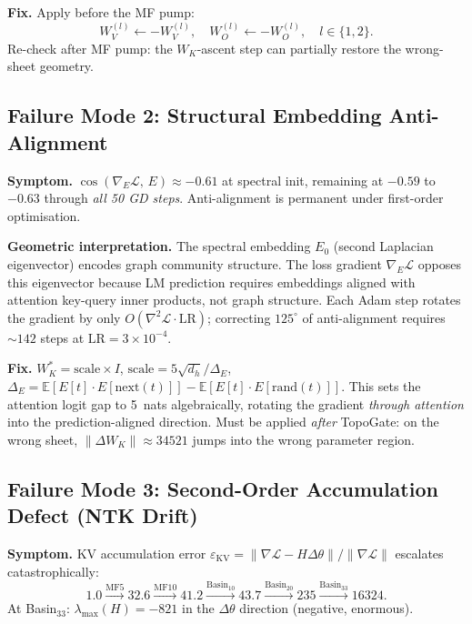 \documentclass[11pt]{amsart}
\begin{document}
\textbf{Fix.} Apply before the MF pump:
\[
  W_V^{(l)} \leftarrow -W_V^{(l)}, \quad
  W_O^{(l)} \leftarrow -W_O^{(l)}, \quad l \in \{1,2\}.
\]
Re-check after MF pump: the $W_K$-ascent step can partially restore
the wrong-sheet geometry.

\subsection{Failure Mode 2: Structural Embedding Anti-Alignment}

\textbf{Symptom.}
$\cos(\nabla_E \mathcal{L},\, E) \approx -0.61$ at spectral init,
remaining at $-0.59$ to $-0.63$ through \emph{all 50 GD steps}.
Anti-alignment is permanent under first-order optimisation.

\textbf{Geometric interpretation.}
The spectral embedding $E_0$ (second Laplacian eigenvector) encodes
graph community structure.
The loss gradient $\nabla_E \mathcal{L}$ opposes this eigenvector
because LM prediction requires embeddings aligned with attention
key-query inner products, not graph structure.
Each Adam step rotates the gradient by only $O(\nabla^2\mathcal{L}
\cdot \mathrm{LR})$; correcting $125^\circ$ of anti-alignment requires
$\sim\!142$ steps at $\mathrm{LR}=3\times10^{-4}$.

\textbf{Fix.}
$W_K^* = \mathrm{scale}\times I$,
$\mathrm{scale} = 5\sqrt{d_h}/\Delta_E$,
$\Delta_E = \mathbb{E}[E[t]\cdot E[\mathrm{next}(t)]]
- \mathbb{E}[E[t]\cdot E[\mathrm{rand}(t)]]$.
This sets the attention logit gap to 5~nats algebraically, rotating the
gradient \emph{through attention} into the prediction-aligned direction.
Must be applied \emph{after} TopoGate: on the wrong sheet,
$\|\Delta W_K\|\approx 34521$ jumps into the wrong parameter region.

\subsection{Failure Mode 3: Second-Order Accumulation Defect (NTK Drift)}

\textbf{Symptom.}
KV accumulation error $\varepsilon_\mathrm{KV} = \|\nabla\mathcal{L}
- H\Delta\theta\|/\|\nabla\mathcal{L}\|$ escalates catastrophically:
\[
  1.0
  \xrightarrow{\mathrm{MF5}} 32.6
  \xrightarrow{\mathrm{MF10}} 41.2
  \xrightarrow{\mathrm{Basin}_{10}} 43.7
  \xrightarrow{\mathrm{Basin}_{20}} 235
  \xrightarrow{\mathrm{Basin}_{33}} 16324.
\]
At Basin$_{33}$: $\lambda_{\max}(H) = -821$ in the $\Delta\theta$
direction (negative, enormous).
\end{document}
